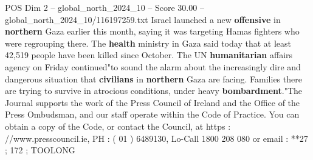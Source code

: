 \begin{textsample}{POS Dim 2 – global\_north\_2024\_10 – Score 30.00 – global\_north\_2024\_10/116197259.txt}
Israel launched a new \textbf{offensive} in \textbf{northern} Gaza earlier this month, saying it was targeting Hamas fighters who were regrouping there.
The \textbf{health} ministry in Gaza said today that at least 42,519 people have been killed since October.
The UN \textbf{humanitarian} affairs agency on Friday continued"to sound the alarm about the increasingly dire and dangerous situation that \textbf{civilians} in \textbf{northern} Gaza are facing.
Families there are trying to survive in atrocious conditions, under heavy \textbf{bombardment}."The Journal supports the work of the Press Council of Ireland and the Office of the Press Ombudsman, and our staff operate within the Code of Practice.
You can obtain a copy of the Code, or contact the Council, at https : //www.presscouncil.ie, PH : ( 01 ) 6489130, Lo-Call 1800 208 080 or email : **27 ; 172 ; TOOLONG

\end{textsample}
